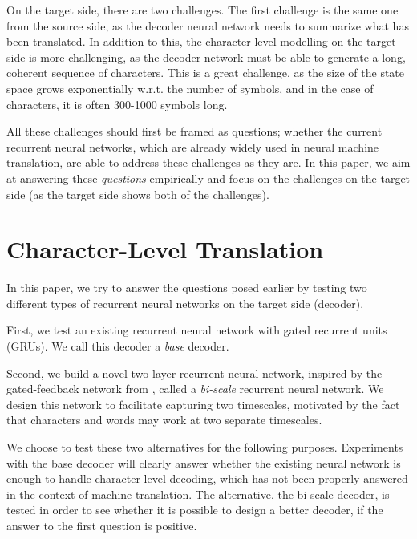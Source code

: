 \documentclass[11pt]{article}
\begin{document}
On the target side, there are two challenges. The first challenge is the same
one from the source side, as the decoder neural network needs to summarize what
has been translated. 
In addition to this, the character-level modelling on the target side is more
challenging, as the decoder network must be able to generate a long, coherent
sequence of characters. This is a great challenge, as the size of the state
space grows exponentially w.r.t. the
number of symbols, and in the case of characters, it is often 300-1000 symbols
long.

All these challenges should first be framed as questions; whether the current
recurrent neural networks, which are already widely used in neural machine
translation, are able to address these challenges as they are. In this paper, we
aim at answering these {\em questions} empirically and focus on the challenges
on the target side (as the target side shows both of the challenges).

\section{Character-Level Translation}
\label{sec:char_trans}

In this paper, we try to answer the questions posed earlier by testing two
different types of recurrent neural networks on the target side (decoder).

First, we test an existing recurrent neural network with gated recurrent units
(GRUs). We call this decoder a {\em base} decoder.

Second, we build a novel two-layer recurrent neural network, inspired by the
gated-feedback network from , called a {\em bi-scale}
recurrent neural network. 
We design this network to facilitate capturing two timescales, motivated by the
fact that characters and words may work at two separate timescales.

We choose to test these two alternatives for the following purposes. Experiments
with the base decoder will clearly answer whether the existing neural network is
enough to handle character-level decoding, which has not been properly answered
in the context of machine translation. The alternative, the bi-scale decoder, is
tested in order to see whether it is possible to design a better decoder, if the
answer to the first question is positive.
\end{document}

